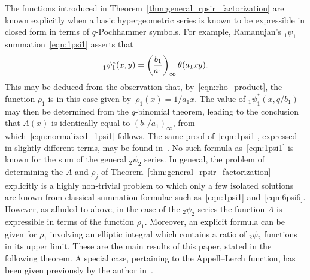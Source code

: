 \documentclass[10pt,a4paper]{amsart}
\numberwithin{equation}{section}
\begin{document}
The functions introduced in Theorem~\ref{thm:general_rpsir_factorization} are known explicitly when a basic hypergeometric series is known to be expressible in closed form in terms of $q$-Pochhammer symbols. For example, Ramanujan's $_1\psi_1$ summation~\eqref{eqn:1psi1} asserts that
\begin{equation} \label{eqn:normalized_1psi1}
_1^{}\psi_1^\ast(x,y) = \left({b_1 \over a_1}\right)_{ \infty} \theta(a_1xy).
\end{equation}
This may be deduced from the observation that, by~\eqref{eqn:rho_product}, the function $\rho_1$ is in this case given by~${\rho_1(x)=1/a_1x}$. The value of $_1\psi_1^\ast(x,q/b_1)$ may then be determined from the $q$-binomial theorem, leading to the conclusion that $A(x)$ is identically equal to $(b_1/a_1)_\infty$, from which~\eqref{eqn:normalized_1psi1} follows. The same proof of~\eqref{eqn:1psi1}, expressed in slightly different terms, may be found in~\cite[Section~1.1]{Ito2014}. No such formula as~\eqref{eqn:1psi1} is known for the sum of the general $_2\psi_2$ series. In general, the problem of determining the $A$ and $\rho_j$ of Theorem~\ref{thm:general_rpsir_factorization} explicitly is a highly non-trivial problem to which only a few isolated solutions are known from classical summation formulae such as~\eqref{eqn:1psi1} and~\eqref{eqn:6psi6}. However, as alluded to above, in the case of the $_2\psi_2$ series the function $A$ is expressible in terms of the function $\rho_1$. Moreover, an explicit formula can be given for $\rho_1$ involving an elliptic integral which contains a ratio of $_2\psi_2$ functions in its upper limit. These are the main results of this paper, stated in the following theorem. A special case, pertaining to the Appell--Lerch function, has been given previously by the author in~\cite[Section~3.8]{Bradley-Thrush2023}.
\end{document}
